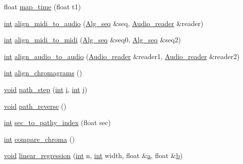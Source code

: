 \begin{DoxyCompactItemize}
\item 
float \hyperlink{class_scorealign_aeebbba309cdbaa0a82de51906cfa243b}{map\+\_\+time} (float t1)
\item 
\hyperlink{xmltok_8h_a5a0d4a5641ce434f1d23533f2b2e6653}{int} \hyperlink{class_scorealign_aa6a81c58ac35cb4910946072402ef1b9}{align\+\_\+midi\+\_\+to\+\_\+audio} (\hyperlink{class_alg__seq}{Alg\+\_\+seq} \&seq, \hyperlink{class_audio__reader}{Audio\+\_\+reader} \&reader)
\item 
\hyperlink{xmltok_8h_a5a0d4a5641ce434f1d23533f2b2e6653}{int} \hyperlink{class_scorealign_a791e1a30a36f443da8c28efdc62f0bf6}{align\+\_\+midi\+\_\+to\+\_\+midi} (\hyperlink{class_alg__seq}{Alg\+\_\+seq} \&seq0, \hyperlink{class_alg__seq}{Alg\+\_\+seq} \&seq2)
\item 
\hyperlink{xmltok_8h_a5a0d4a5641ce434f1d23533f2b2e6653}{int} \hyperlink{class_scorealign_a541fb5fafb2c6043bebb229c3cd7afff}{align\+\_\+audio\+\_\+to\+\_\+audio} (\hyperlink{class_audio__reader}{Audio\+\_\+reader} \&reader1, \hyperlink{class_audio__reader}{Audio\+\_\+reader} \&reader2)
\item 
\hyperlink{xmltok_8h_a5a0d4a5641ce434f1d23533f2b2e6653}{int} \hyperlink{class_scorealign_a7ea9b49c78bd880dad488a68cdee5aab}{align\+\_\+chromagrams} ()
\item 
\hyperlink{sound_8c_ae35f5844602719cf66324f4de2a658b3}{void} \hyperlink{class_scorealign_af49b7fa36c01f092d1c35d7b57c5b15f}{path\+\_\+step} (\hyperlink{xmltok_8h_a5a0d4a5641ce434f1d23533f2b2e6653}{int} \hyperlink{checksum_8c_ab80e330a3bc9e38c1297fe17381e92b4}{i}, \hyperlink{xmltok_8h_a5a0d4a5641ce434f1d23533f2b2e6653}{int} j)
\item 
\hyperlink{sound_8c_ae35f5844602719cf66324f4de2a658b3}{void} \hyperlink{class_scorealign_a20e1e85ebf0e4d8414d8db452fe0fbe6}{path\+\_\+reverse} ()
\item 
\hyperlink{xmltok_8h_a5a0d4a5641ce434f1d23533f2b2e6653}{int} \hyperlink{class_scorealign_a47c81dfe558d21907a2467103d184f6f}{sec\+\_\+to\+\_\+pathy\+\_\+index} (float sec)
\item 
\hyperlink{xmltok_8h_a5a0d4a5641ce434f1d23533f2b2e6653}{int} \hyperlink{class_scorealign_a53aeb04a4368f66f94c9559c13bb98b5}{compare\+\_\+chroma} ()
\item 
\hyperlink{sound_8c_ae35f5844602719cf66324f4de2a658b3}{void} \hyperlink{class_scorealign_abe1d65b29fe00e4d80b23dbdff649083}{linear\+\_\+regression} (\hyperlink{xmltok_8h_a5a0d4a5641ce434f1d23533f2b2e6653}{int} n, \hyperlink{xmltok_8h_a5a0d4a5641ce434f1d23533f2b2e6653}{int} width, float \&\hyperlink{rfft2d_test_m_l_8m_a4124bc0a9335c27f086f24ba207a4912}{a}, float \&\hyperlink{convtest_8m_a21ad0bd836b90d08f4cf640b4c298e7c}{b})

\end{DoxyCompactItemize}
